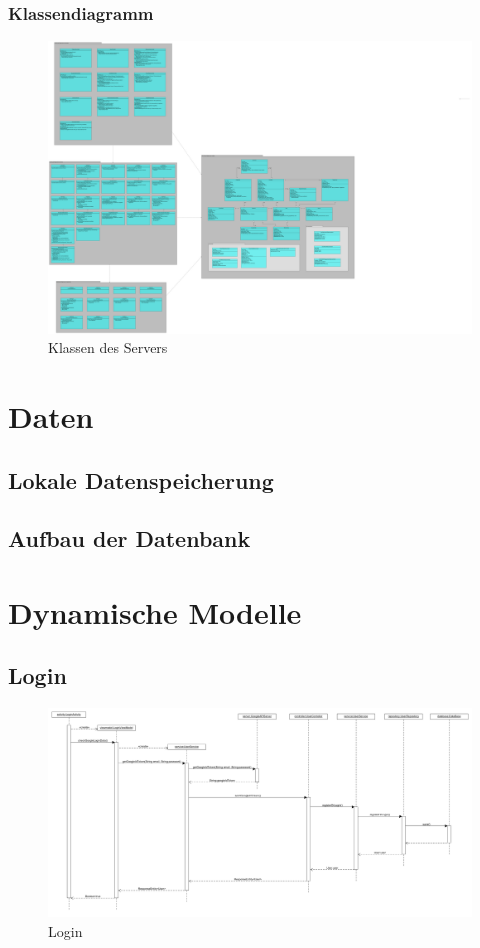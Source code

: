 \documentclass[a4paper]{scrreprt}
\begin{document}
		\subsection{Klassendiagramm}
		\begin{figure}[H]
	       \centering
	       \includegraphics[scale = .05]{server-packages.png}
	       \caption{Klassen des Servers}
	      \end{figure}

	
 

\chapter{Daten}
	\section{Lokale Datenspeicherung}
	\section{Aufbau der Datenbank}

\chapter{Dynamische Modelle}
		\section{Login}
		 \begin{figure}[H]
	       \centering
	       \includegraphics[angle=90,scale = .28]{login_sequenzdiagramm.png}
	       \caption{Login}
	      \end{figure}
	 
\end{document}
